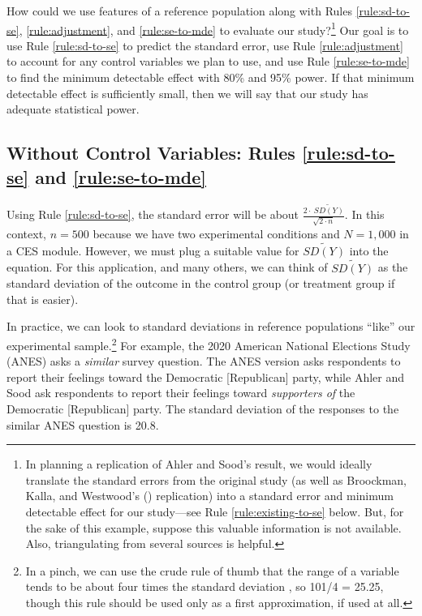 \documentclass[12pt]{article}
\begin{document}
How could we use features of a reference population along with Rules \ref{rule:sd-to-se}, \ref{rule:adjustment}, and \ref{rule:se-to-mde} to evaluate our study?\footnote{
  In planning a replication of Ahler and Sood's result, we would ideally translate the standard errors from the original study (as well as Broockman, Kalla, and Westwood's (\citeyear{Broockman2022}) replication) into a standard error and minimum detectable effect for our study---see Rule \ref{rule:existing-to-se} below. 
  But, for the sake of this example, suppose this valuable information is not available.
  Also, triangulating from several sources is helpful.} 
Our goal is to use Rule \ref{rule:sd-to-se} to predict the standard error, use Rule \ref{rule:adjustment} to account for any control variables we plan to use, and use Rule \ref{rule:se-to-mde} to find the minimum detectable effect with 80\% and 95\% power. 
If that minimum detectable effect is sufficiently small, then we will say that our study has adequate statistical power.

\subsection*{Without Control Variables: Rules \ref{rule:sd-to-se} and \ref{rule:se-to-mde}}

Using Rule \ref{rule:sd-to-se}, the standard error will be about $\frac{2 \cdot \ \widetilde{SD(Y)}}{\sqrt{2 \cdot n}}$. 
In this context, $n = 500$ because we have two experimental conditions and $N = 1,000$ in a CES module. 
However, we must plug a suitable value for $\widetilde{SD(Y)}$ into the equation. For this application, and many others, we can think of $\widetilde{SD(Y)}$ as the standard deviation of the outcome in the control group (or treatment group if that is easier).

In practice, we can look to standard deviations in reference populations ``like'' our experimental sample.\footnote{In a pinch, we can use the crude rule of thumb that the range of a variable tends to be about four times the standard deviation \citep{Wan2014}, so 101/4 = 25.25, though this rule should be used only as a first approximation, if used at all.} 
For example, the 2020 American National Elections Study (ANES) asks a \emph{similar} survey question. 
The ANES version asks respondents to report their feelings toward the Democratic [Republican] party, while Ahler and Sood ask respondents to report their feelings toward \emph{supporters of} the Democratic [Republican] party. 
The standard deviation of the responses to the similar ANES question is 20.8.
\end{document}
